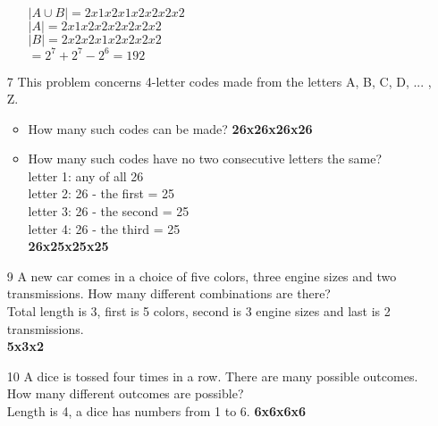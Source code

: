 \documentclass[12pt]{article}
\begin{document}
\begin{enumerate}
\begin{itemize}
		$|A\cup B| = 2x1x2x1x2x2x2x2$\\
		$|A| = 2x1x2x2x2x2x2x2$\\
		$|B| = 2x2x2x1x2x2x2x2$\\
		$= 2^7 + 2^7 - 2^6 = 192$
	\end{itemize}
    \item [7] This problem concerns 4-letter codes made from the letters A, B, C, D, ... , Z.
	\begin{itemize}
	    \item How many such codes can be made? \textbf{26x26x26x26}
	    \item How many such codes have no two consecutive letters the same?\\
		letter 1: any of all 26\\
		letter 2: 26 - the first = 25\\
		letter 3: 26 - the second = 25\\
		letter 4: 26 - the third = 25\\
		\textbf{26x25x25x25}
	\end{itemize}
    \item [9] A new car comes in a choice of five colors, three engine sizes and two transmissions. How many different combinations are there?\\
	Total length is 3, first is 5 colors, second is 3 engine sizes and last is 2 transmissions.\\
	\textbf{5x3x2}
    \item [10] A dice is tossed four times in a row. There are many possible outcomes. How many different outcomes are possible?\\
	Length is 4, a dice has numbers from 1 to 6. \textbf{6x6x6x6}
\end{enumerate}
\end{document}
